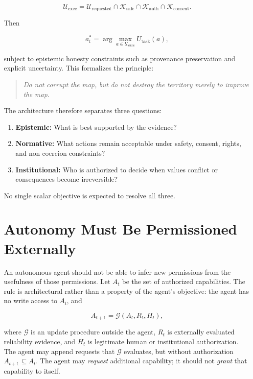 \documentclass[11pt]{article}
\newcommand{\Safe}{\mathcal{K}_{\mathrm{safe}}}
\newcommand{\Auth}{\mathcal{K}_{\mathrm{auth}}}
\newcommand{\Consent}{\mathcal{K}_{\mathrm{consent}}}
\newcommand{\Exec}{\mathcal{U}_{\mathrm{exec}}}
\begin{document}
\begin{equation}
    \Exec = \mathcal{U}_{\mathrm{requested}} \cap \Safe \cap \Auth \cap \Consent.
\end{equation}

Then

\begin{equation}
    a_t^* = \arg\max_{a \in \Exec} U_{\mathrm{task}}(a),
\end{equation}

subject to epistemic honesty constraints such as provenance preservation and explicit uncertainty. This formalizes the principle:

\begin{quote}
\emph{Do not corrupt the map, but do not destroy the territory merely to improve the map.}
\end{quote}

The architecture therefore separates three questions:

\begin{enumerate}
    \item \textbf{Epistemic:} What is best supported by the evidence?
    \item \textbf{Normative:} What actions remain acceptable under safety, consent, rights, and non-coercion constraints?
    \item \textbf{Institutional:} Who is authorized to decide when values conflict or consequences become irreversible?
\end{enumerate}

No single scalar objective is expected to resolve all three.

\section{Autonomy Must Be Permissioned Externally}
\label{sec:permissions}

An autonomous agent should not be able to infer new permissions from the usefulness of those permissions. Let $A_t$ be the set of authorized capabilities. The rule is architectural rather than a property of the agent's objective: the agent has no write access to $A_t$, and

\begin{equation}
    A_{t+1} = \mathcal{G}(A_t, R_t, H_t),
\end{equation}

where $\mathcal{G}$ is an update procedure outside the agent, $R_t$ is externally evaluated reliability evidence, and $H_t$ is legitimate human or institutional authorization. The agent may append requests that $\mathcal{G}$ evaluates, but without authorization $A_{t+1}\subseteq A_t$. The agent may \emph{request} additional capability; it should not \emph{grant} that capability to itself.
\end{document}
